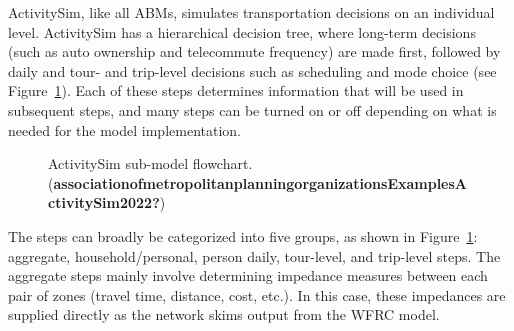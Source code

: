 \documentclass[fancy, twoside, mastersfancy, ms]{byuthesis}
\begin{document}
ActivitySim, like all ABMs, simulates transportation decisions on an
individual level. ActivitySim has a hierarchical decision tree, where
long-term decisions (such as auto ownership and telecommute frequency)
are made first, followed by daily and tour- and trip-level decisions
such as scheduling and mode choice (see
Figure~\ref{fig-asim-flowchart}). Each of these steps determines
information that will be used in subsequent steps, and many steps can be
turned on or off depending on what is needed for the model
implementation.

\begin{figure}


\caption[ActivitySim sub-model
flowchart.]{\label{fig-asim-flowchart}ActivitySim sub-model flowchart.
(\textbf{associationofmetropolitanplanningorganizationsExamplesActivitySim2022?})}

\end{figure}%

The steps can broadly be categorized into five groups, as shown in
Figure~\ref{fig-asim-flowchart}: aggregate, household/personal, person
daily, tour-level, and trip-level steps. The aggregate steps mainly
involve determining impedance measures between each pair of zones
(travel time, distance, cost, etc.). In this case, these impedances are
supplied directly as the network skims output from the WFRC model.
\end{document}
